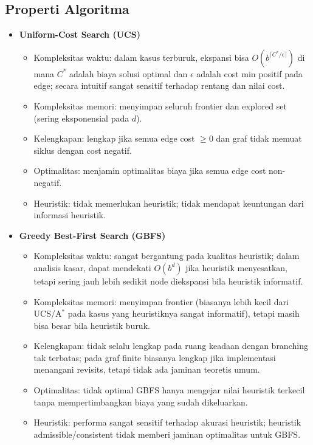 \subsection{Properti Algoritma}
\begin{itemize}
    \item \textbf{Uniform-Cost Search (UCS)}
          \begin{itemize}
              \item Kompleksitas waktu: dalam kasus terburuk, ekspansi bisa $O(b^{\lceil C^*/\epsilon\rceil})$ di mana $C^*$ adalah biaya solusi optimal dan $\epsilon$ adalah cost min positif pada edge; secara intuitif sangat sensitif terhadap rentang dan nilai cost.
              \item Kompleksitas memori: menyimpan seluruh frontier dan explored set (sering eksponensial pada $d$).
              \item Kelengkapan: lengkap jika semua edge cost $\ge 0$ dan graf tidak memuat siklus dengan cost negatif.
              \item Optimalitas: menjamin optimalitas biaya jika semua edge cost non-negatif.
              \item Heuristik: tidak memerlukan heuristik; tidak mendapat keuntungan dari informasi heuristik.
          \end{itemize}

    \item \textbf{Greedy Best-First Search (GBFS)}
          \begin{itemize}
              \item Kompleksitas waktu: sangat bergantung pada kualitas heuristik; dalam analisis kasar, dapat mendekati $O(b^d)$ jika heuristik menyesatkan, tetapi sering jauh lebih sedikit node diekspansi bila heuristik informatif.
              \item Kompleksitas memori: menyimpan frontier (biasanya lebih kecil dari UCS/A$^\ast$ pada kasus yang heuristiknya sangat informatif), tetapi masih bisa besar bila heuristik buruk.
              \item Kelengkapan: tidak selalu lengkap pada ruang keadaan dengan branching tak terbatas; pada graf finite biasanya lengkap jika implementasi menangani revisits, tetapi tidak ada jaminan teoretis umum.
              \item Optimalitas: tidak optimal  GBFS hanya mengejar nilai heuristik terkecil tanpa mempertimbangkan biaya yang sudah dikeluarkan.
              \item Heuristik: performa sangat sensitif terhadap akurasi heuristik; heuristik admissible/consistent tidak memberi jaminan optimalitas untuk GBFS.
          \end{itemize}


\end{itemize}
